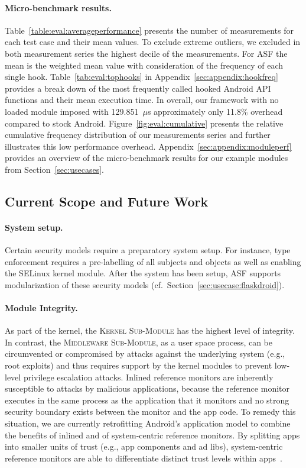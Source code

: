 \documentclass[letterpaper,twocolumn,10pt]{article}
\newcommand{\OURSHORT}{\textsc{ASF}\xspace}
\newcommand{\KMODULE}{\textsc{Kernel Sub-Module}\xspace}
\newcommand{\MMODULE}{\textsc{Middleware Sub-Module}\xspace}
\begin{document}
\paragraph{Micro-benchmark results.}
Table~\ref{table:eval:averageperformance} presents the number of measurements for each test case and their mean values. To exclude extreme outliers, we excluded in both measurement series the highest decile of the measurements. For \OURSHORT the mean is the weighted mean value with consideration of the frequency of each single hook. Table~\ref{tab:eval:tophooks} in Appendix~\ref{sec:appendix:hookfreq} provides a break down of the most frequently called hooked Android API functions and their mean execution time. In overall, our framework with no loaded module imposed with 129.851~$\mu$s approximately only 11.8\% overhead compared to stock Android. Figure~\ref{fig:eval:cumulative} presents the relative cumulative frequency distribution of our measurements series and further illustrates this low performance overhead. Appendix~\ref{sec:appendix:moduleperf} provides an overview of the micro-benchmark results for our example modules from Section~\ref{sec:usecases}.


\subsection{Current Scope and Future Work}
\label{sec:eval:limitations}

\paragraph{System setup.}

Certain security models require a preparatory system setup. For instance, type enforcement requires a pre-labelling of all subjects and objects as well as enabling the SELinux kernel module. After the system has been setup, \OURSHORT supports modularization of these security models (cf.~Section~\ref{sec:usecase:flaskdroid}).

\paragraph{Module Integrity.}

As part of the kernel, the \KMODULE has the highest level of integrity. In contrast, the \MMODULE, as a user space process, can be circumvented or compromised by attacks against the underlying system (e.g., root exploits) and thus requires support by the kernel modules to prevent low-level privilege escalation attacks. Inlined reference monitors are inherently susceptible to attacks by malicious applications, because the reference monitor executes in the same process as the application that it monitors and no strong security boundary exists between the monitor and the app code. To remedy this situation, we are currently retrofitting Android's application model to combine the benefits of inlined and of system-centric reference monitors. By splitting apps into smaller units of trust (e.g., app components and ad libs), system-centric reference monitors are able to differentiate distinct trust levels within apps~\cite{Provos:2003:PPE:1251353.1251369,Wang:2014:compasec,Shekhar:2012:ASS:2362793.2362821,Pearce:2012:APS:2414456.2414498}.
\end{document}
